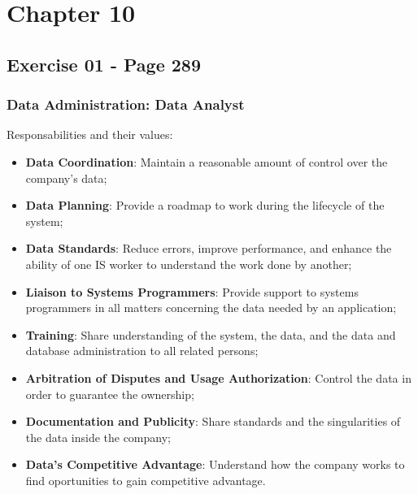\chapter{Chapter 10}
	\section{Exercise 01 - Page 289}
		\subsection{Data Administration: Data Analyst}
			Responsabilities and their values:
			\begin{itemize}
				\item{\textbf{Data Coordination}: Maintain a reasonable amount of control over the company's data;}
				\item{\textbf{Data Planning}: Provide a roadmap to work during the lifecycle of the system;}
				\item{\textbf{Data Standards}: Reduce errors, improve performance, and enhance the ability of one IS worker to understand the work done by another;}
				\item{\textbf{Liaison to Systems Programmers}: Provide support to systems programmers in all matters concerning the data needed by an application;}
				\item{\textbf{Training}: Share understanding of the system, the data, and the data and database administration to all related persons;}
				\item{\textbf{Arbitration of Disputes and Usage Authorization}: Control the data in order to guarantee the ownership;}
				\item{\textbf{Documentation and Publicity}: Share standards and the singularities of the data inside the company;}
				\item{\textbf{Data's Competitive Advantage}: Understand how the company works to find oportunities to gain competitive advantage.}
			\end{itemize}
